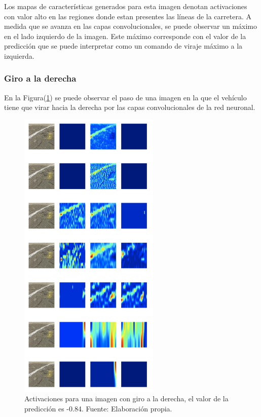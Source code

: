         Los mapas de características generados para esta imagen denotan activaciones con valor alto en las regiones donde estan 
        presentes las líneas de la carretera. A medida que se avanza en las capas convolucionales, se puede observar un máximo 
        en el lado izquierdo de la imagen. Este máximo corresponde con el valor de la predicción que se puede interpretar como un comando 
        de viraje máximo a la izquierda.
        

        \subsubsection{Giro a la derecha}
        En la Figura(\ref{fig:predder}) se puede observar el paso de una imagen en la que el vehículo tiene que virar hacia la derecha por 
        las capas convolucionales de la red neuronal. 

        \begin{figure}[!h] 
            \centering
            \includegraphics[width=0.60\textwidth]{img/predder}
            \caption[Activaciones para una imagen con giro a la derecha]{Activaciones para una imagen con giro a la derecha, el valor de 
            la predicción es -0.84. Fuente: Elaboración propia. }
            \label{fig:predder}
        \end{figure}

